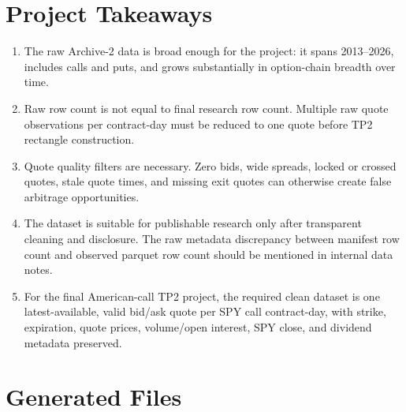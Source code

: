 \documentclass[11pt]{article}
\begin{document}
\section*{Project Takeaways}

\begin{enumerate}
  \item The raw Archive-2 data is broad enough for the project: it spans 2013--2026,
  includes calls and puts, and grows substantially in option-chain breadth over
  time.
  \item Raw row count is not equal to final research row count. Multiple raw
  quote observations per contract-day must be reduced to one quote before TP2
  rectangle construction.
  \item Quote quality filters are necessary. Zero bids, wide spreads, locked or
  crossed quotes, stale quote times, and missing exit quotes can otherwise
  create false arbitrage opportunities.
  \item The dataset is suitable for publishable research only after transparent
  cleaning and disclosure. The raw metadata discrepancy between manifest row
  count and observed parquet row count should be mentioned in internal data
  notes.
  \item For the final American-call TP2 project, the required clean dataset is
  one latest-available, valid bid/ask quote per SPY call contract-day, with strike,
  expiration, quote prices, volume/open interest, SPY close, and dividend
  metadata preserved.
\end{enumerate}

\section*{Generated Files}
\end{document}
